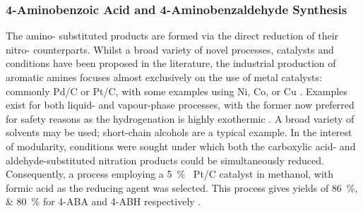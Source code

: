 \subsubsection{4-Aminobenzoic Acid and 4-Aminobenzaldehyde Synthesis}
The amino- substituted products are formed via the direct reduction of their nitro- counterparts.
Whilst a broad variety of novel processes, catalysts and conditions have been proposed in the literature, the industrial production of aromatic amines focuses almost exclusively on the use of metal catalysts: commonly Pd/C or Pt/C, with some examples using Ni, Co, or Cu \cite{vogt_amines_2000,cartolano_amines_2004}.
Examples exist for both liquid- and vapour-phase processes, with the former  now preferred for safety reasons as the hydrogenation is highly exothermic \cite{vogt_amines_2000}.
A broad variety of solvents may be used; short-chain alcohols are a typical example.
In the interest of modularity, conditions were sought under which both the carboxylic acid- and aldehyde-substituted nitration products could be simultaneously reduced.
Consequently, a process employing a \SI{5}{\percent\ww} Pt/C catalyst in methanol, with formic acid as the reducing agent was selected.
This process gives yields of \SIlist{86;80}{\percent} for 4-ABA and 4-ABH respectively \cite{gowda_catalytic_2000}.



